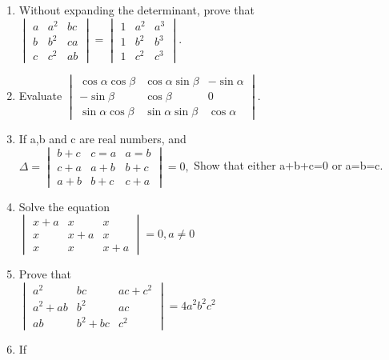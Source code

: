 \begin{enumerate}[label=\arabic*.,ref=\thesubsection.\theenumi]
\item Without expanding the determinant, prove that\\ $\begin{vmatrix}
a&a^2&bc \\ b&b^2&ca \\c&c^2&ab
\end{vmatrix}=\begin{vmatrix}
1&a^2&a^3 \\ 1&b^2&b^3 \\ 1&c^2&c^3
\end{vmatrix}$.
\\
\solution

\item Evaluate 
$\begin{vmatrix}
\cos\alpha \cos\beta &\cos\alpha \sin\beta &-\sin\alpha \\ -\sin\beta & \cos\beta &0 \\ \sin\alpha\cos\beta&\sin\alpha\sin\beta&\cos\alpha
\end{vmatrix}.$\\
\solution 

\item If a,b and c are real numbers, and \\$\Delta=\begin{vmatrix}
b+c&c=a&a=b \\ c+a&a+b&b+c \\ a+b&b+c&c+a
\end{vmatrix}=0,$ Show that either a+b+c=0 or a=b=c.\\
\solution 

\item Solve the equation\\ $\begin{vmatrix}
x+a&x&x \\ x&x+a&x \\ x&x&x+a
\end{vmatrix}=0, a\neq0$\\
\solution 

\item Prove that \\
$\begin{vmatrix}
a^2&bc&ac+c^2 \\ a^2+ab&b^2&ac \\ab&b^2+bc&c^2
\end{vmatrix}= 4a^2b^2c^2$\\
\solution 

\item If \\

\end{enumerate}
